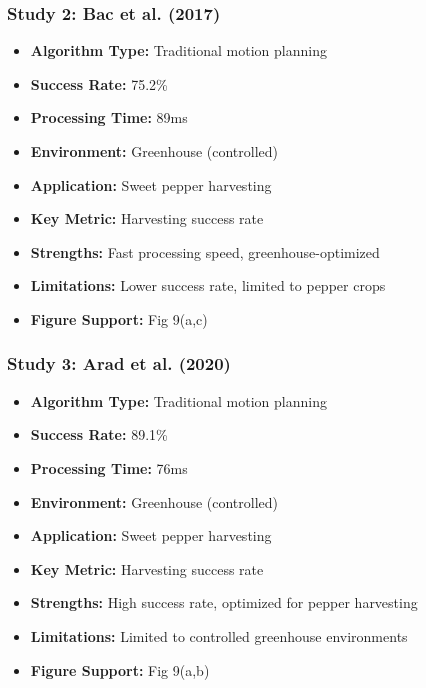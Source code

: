 \documentclass[11pt]{article}
\begin{document}
\subsubsection{Study 2: Bac et al. (2017) \cite{bac2017performance}}
\begin{itemize}
    \item \textbf{Algorithm Type:} Traditional motion planning
    \item \textbf{Success Rate:} 75.2\%
    \item \textbf{Processing Time:} 89ms
    \item \textbf{Environment:} Greenhouse (controlled)
    \item \textbf{Application:} Sweet pepper harvesting
    \item \textbf{Key Metric:} Harvesting success rate
    \item \textbf{Strengths:} Fast processing speed, greenhouse-optimized
    \item \textbf{Limitations:} Lower success rate, limited to pepper crops
    \item \textbf{Figure Support:} Fig 9(a,c)
\end{itemize}

\subsubsection{Study 3: Arad et al. (2020) \cite{arad2020development}}
\begin{itemize}
    \item \textbf{Algorithm Type:} Traditional motion planning
    \item \textbf{Success Rate:} 89.1\%
    \item \textbf{Processing Time:} 76ms
    \item \textbf{Environment:} Greenhouse (controlled)
    \item \textbf{Application:} Sweet pepper harvesting
    \item \textbf{Key Metric:} Harvesting success rate
    \item \textbf{Strengths:} High success rate, optimized for pepper harvesting
    \item \textbf{Limitations:} Limited to controlled greenhouse environments
    \item \textbf{Figure Support:} Fig 9(a,b)
\end{itemize}
\end{document}
